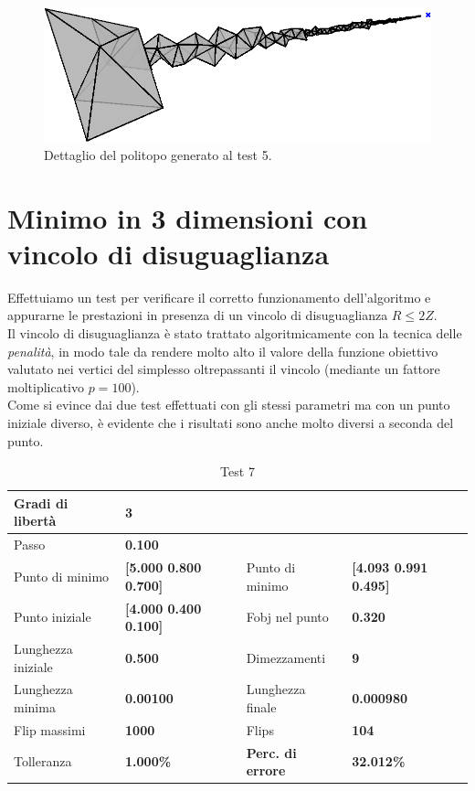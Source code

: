 \documentclass[a4paper, 11pt]{article}
\begin{document}
\begin{figure}[H]
    \centering
        \includegraphics[width=14cm]{assets/figure6}
        \caption{Dettaglio del politopo generato al test 5.}
\end{figure}
\noindent

\newpage
\section{Minimo in 3 dimensioni con vincolo di disuguaglianza}

Effettuiamo un test per verificare il corretto funzionamento dell'algoritmo e
appurarne le prestazioni in presenza di un vincolo di disuguaglianza $R \le 2Z$.
\\
Il vincolo di disuguaglianza è stato trattato algoritmicamente con la tecnica
delle \emph{penalità}, in modo tale da rendere molto alto il valore della
funzione obiettivo valutato nei vertici del simplesso oltrepassanti il vincolo
(mediante un fattore moltiplicativo $p = 100$). \\
Come si evince dai due test effettuati con gli stessi parametri ma con un punto
iniziale diverso, è evidente che i risultati sono anche molto diversi a seconda
del punto.

\begin{table}[h]
    \caption{Test 7}
    \begin{center}
    \begin{tabular}{|l|l|l|l|} 
    \hline 
Gradi di libertà & \textbf{3} &  &  \\ \hline 
Passo & \textbf{0.100} &  &  \\ \hline 
Punto di minimo & \textbf{{[}5.000 0.800 0.700{]}} & Punto di minimo &
\textbf{{[}4.093 0.991 0.495{]}} \\ \hline 
Punto iniziale & \textbf{{[}4.000 0.400 0.100{]}} & Fobj nel punto &
\textbf{0.320} \\ \hline 
Lunghezza iniziale & \textbf{0.500} & Dimezzamenti & \textbf{9} \\ \hline 
Lunghezza minima & \textbf{0.00100} & Lunghezza finale & \textbf{0.000980} \\
\hline
Flip massimi & \textbf{1000} & Flips & \textbf{104} \\ \hline 
Tolleranza & \textbf{1.000\%} & \textbf{Perc. di errore} & \textbf{32.012\%} \\
\hline 
    \end{tabular} 
    \end{center}
    \end{table}
\end{document}
